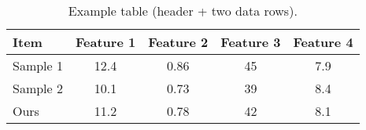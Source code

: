 \begin{table}[H]
    \centering
    \begin{addedenv}
    \caption{Example table (header + two data rows).}
    \label{tab:table1}
    \begin{tabular}{lcccc}
    \toprule
    Item & Feature 1 & Feature 2 & Feature 3 & Feature 4 \\
    \midrule
    Sample 1 & 12.4 & 0.86 & 45 & 7.9 \\
    Sample 2 & 10.1 & 0.73 & 39 & 8.4 \\
    \cellcolor[HTML]{F9D7EF}Ours & \cellcolor[HTML]{F9D7EF}11.2 & \cellcolor[HTML]{F9D7EF}0.78 & \cellcolor[HTML]{F9D7EF}42 & \cellcolor[HTML]{F9D7EF}8.1 \\
    \bottomrule
    \end{tabular}
    \end{addedenv}
\end{table}
    